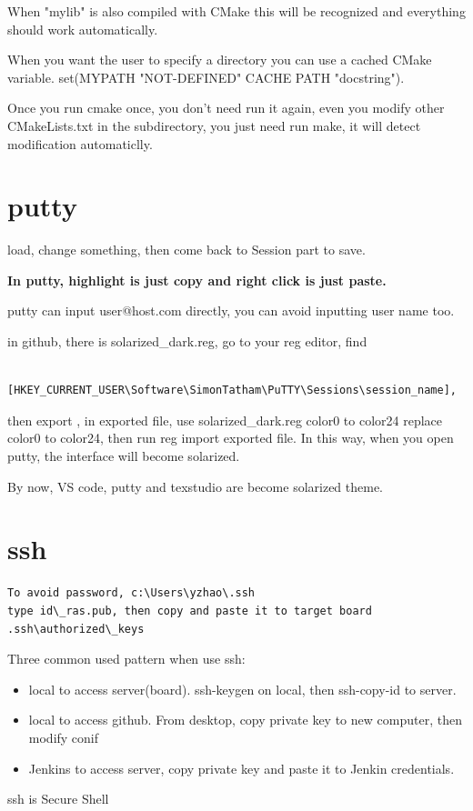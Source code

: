 \documentclass[paper=8.5in:11in, twoside, 12pt, pagesize=pdftex]{book}
\begin{document}
	When "mylib" is also compiled with CMake this will be recognized and everything should work automatically.

	When you want the user to specify a directory you can use a cached CMake variable. set(MYPATH "NOT-DEFINED" CACHE PATH "docstring").

	Once you run cmake once, you don't need run it again, even you modify other CMakeLists.txt in the subdirectory, you just need run make, it will detect modification automaticlly. 


\section{putty}

  load, change something, then come back to Session part to save. 
  
  
 \textbf{In putty, highlight is just copy and right click is just paste. } 
 
  putty can input user@host.com directly, you can avoid inputting user name too. 
  
  in github, there is solarized\_dark.reg, go to your reg editor, find
  
  \begin{verbatim}
  	[HKEY_CURRENT_USER\Software\SimonTatham\PuTTY\Sessions\session_name],
  \end{verbatim}  then export , 
  in exported file, use solarized\_dark.reg color0 to color24 replace color0 to color24, then run 
  reg import exported file. In this way, when you open putty, the interface will become solarized.
 
  By now, VS code, putty and texstudio are become solarized theme. 

\section{ssh}

\par 
\begin{lstlisting}
To avoid password, c:\Users\yzhao\.ssh
type id\_ras.pub, then copy and paste it to target board .ssh\authorized\_keys
\end{lstlisting}


\par Three common used pattern when use ssh:
\begin{itemize}
	\item local to access server(board). ssh-keygen on local, then ssh-copy-id to server.
	
	\item local to access github. From desktop, copy private key to new computer, then modify conif
	
	\item Jenkins to access server, copy private key and paste it to Jenkin credentials. 
\end{itemize}
	ssh is Secure Shell
	
\end{document}
